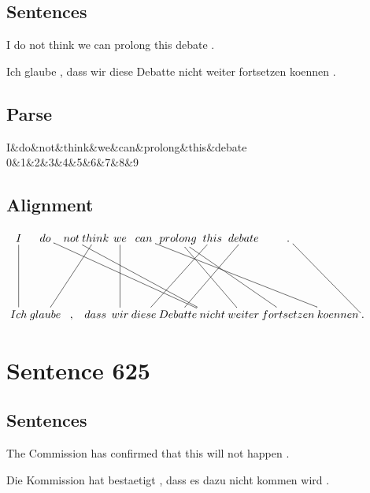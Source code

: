 \documentclass{report}
\begin{document}
\subsection*{Sentences}
I do not think we can prolong this debate .

\noindent Ich glaube , dass wir diese Debatte nicht weiter fortsetzen koennen .



\subsection*{Parse}
\begin{dependency}[theme=simple]
\begin{deptext}[column sep=.5cm, row sep=.1ex]
I\&do\&not\&think\&we\&can\&prolong\&this\&debate\\
0\&1\&2\&3\&4\&5\&6\&7\&8\&9\\
\end{deptext}
\end{dependency}


\subsection*{Alignment}
\scriptsize{
$
\xymatrix@C-2.3pc{
I \ar @{-} [dd] & do \ar @{-} [ddrrrrrr] & not \ar @{-} [ddrrrrr] & think \ar @{-} [ddll] & we \ar @{-} [dd] & can \ar @{-} [ddrrrrr] & prolong \ar @{-} [ddrrr] \ar @{-} [ddrr] & this \ar @{-} [ddll] & debate \ar @{-} [ddll] & . \ar @{-} [ddrr]\\\\
Ich & glaube & , & dass & wir & diese & Debatte & nicht & weiter & fortsetzen & koennen & .
}$}
\newpage\section*{Sentence 625}

\subsection*{Sentences}
The Commission has confirmed that this will not happen .

\noindent Die Kommission hat bestaetigt , dass es dazu nicht kommen wird .
\end{document}
